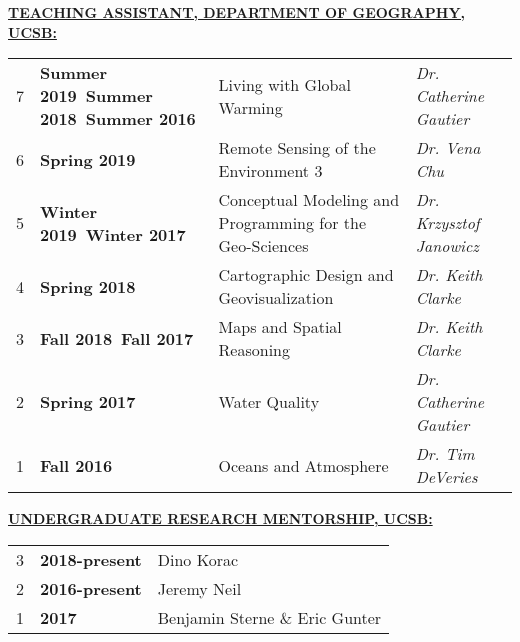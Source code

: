 \documentclass{article}
\newcommand{\header}[1]{\hspace{-5mm}\textcolor{header_blue}{\underline{\textbf{#1}}\\}} %
\begin{document}
\header{TEACHING ASSISTANT, DEPARTMENT OF GEOGRAPHY, UCSB:}
\newline
\vspace{5mm}
\begin{tabular}{rP{2.5cm}P{8.0cm}l}
  7 & \textbf{Summer 2019Summer 2018Summer 2016 } & Living with Global Warming & \textit{Dr. Catherine Gautier } \\ 
  6 & \textbf{Spring 2019 } & Remote Sensing of the Environment 3 & \textit{Dr. Vena Chu } \\ 
  5 & \textbf{Winter 2019Winter 2017 } & Conceptual Modeling and Programming for the Geo-Sciences & \textit{Dr. Krzysztof Janowicz } \\ 
  4 & \textbf{Spring 2018 } & Cartographic Design and Geovisualization & \textit{Dr. Keith Clarke } \\ 
  3 & \textbf{Fall 2018Fall 2017 } & Maps and Spatial Reasoning & \textit{Dr. Keith Clarke } \\ 
  2 & \textbf{Spring 2017 } & Water Quality & \textit{Dr. Catherine Gautier } \\ 
  1 & \textbf{Fall 2016 } & Oceans and Atmosphere & \textit{Dr. Tim DeVeries } \\ 
  \end{tabular}


\header{UNDERGRADUATE RESEARCH MENTORSHIP, UCSB:}
\newline
\vspace{5mm}
\begin{tabular}{rp{2.5cm}p{8.0cm}}
  3 & \textbf{2018-present } & Dino Korac \\ 
  2 & \textbf{2016-present } & Jeremy Neil \\ 
  1 & \textbf{2017 } & Benjamin Sterne \& Eric Gunter \\ 
  \end{tabular}
\end{document}
